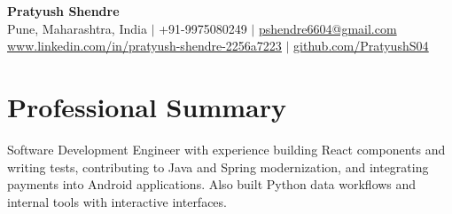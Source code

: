 \documentclass[a4paper,11pt]{article}
\begin{document}
\begin{center}
  {\Large\bfseries Pratyush Shendre}\\[2pt]
  \small Pune, Maharashtra, India $|$ +91-9975080249 $|$
  \href{mailto:pshendre6604@gmail.com}{pshendre6604@gmail.com}\\[1pt]
  \small \href{https://www.linkedin.com/in/pratyush-shendre-2256a7223/}{\underline{www.linkedin.com/in/pratyush-shendre-2256a7223}} $|$
  \href{https://github.com/PratyushS04}{\underline{github.com/PratyushS04}}
\end{center}

\section{Professional Summary}
\small Software Development Engineer with experience building React components and writing tests, contributing to Java and Spring modernization, and integrating payments into Android applications. Also built Python data workf{}lows and internal tools with interactive interfaces.
\end{document}
